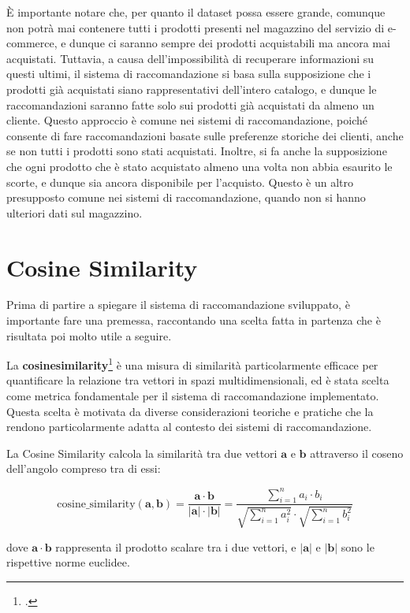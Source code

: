 È importante notare che, per quanto il dataset possa essere grande, comunque non potrà mai contenere tutti i prodotti presenti nel magazzino del servizio di e-commerce, e dunque ci saranno sempre dei prodotti acquistabili ma ancora mai acquistati. Tuttavia, a causa dell'impossibilità di recuperare informazioni su questi ultimi, il sistema di raccomandazione si basa sulla supposizione che i prodotti già acquistati siano rappresentativi dell'intero catalogo, e dunque le raccomandazioni saranno fatte solo sui prodotti già acquistati da almeno un cliente. Questo approccio è comune nei sistemi di raccomandazione, poiché consente di fare raccomandazioni basate sulle preferenze storiche dei clienti, anche se non tutti i prodotti sono stati acquistati.
Inoltre, si fa anche la supposizione che ogni prodotto che è stato acquistato almeno una volta non abbia esaurito le scorte, e dunque sia ancora disponibile per l'acquisto. Questo è un altro presupposto comune nei sistemi di raccomandazione, quando non si hanno ulteriori dati sul magazzino.


\section{Cosine Similarity}

Prima di partire a spiegare il sistema di raccomandazione sviluppato, è importante fare una premessa, raccontando una scelta fatta in partenza che è risultata poi molto utile a seguire.

La \textbf{\gls{cosinesimilarity}}\footcite{site:cosine-similarity} è una misura di similarità particolarmente efficace per quantificare la relazione tra vettori in spazi multidimensionali, ed è stata scelta come metrica fondamentale per il sistema di raccomandazione implementato. Questa scelta è motivata da diverse considerazioni teoriche e pratiche che la rendono particolarmente adatta al contesto dei sistemi di raccomandazione.

La Cosine Similarity calcola la similarità tra due vettori $\mathbf{a}$ e $\mathbf{b}$ attraverso il coseno dell'angolo compreso tra di essi:

\begin{equation}
\text{cosine\_similarity}(\mathbf{a}, \mathbf{b}) = \frac{\mathbf{a} \cdot \mathbf{b}}{|\mathbf{a}| \cdot |\mathbf{b}|} = \frac{\sum_{i=1}^{n} a_i \cdot b_i}{\sqrt{\sum_{i=1}^{n} a_i^2} \cdot \sqrt{\sum_{i=1}^{n} b_i^2}}
\end{equation}

dove $\mathbf{a} \cdot \mathbf{b}$ rappresenta il prodotto scalare tra i due vettori, e $|\mathbf{a}|$ e $|\mathbf{b}|$ sono le rispettive norme euclidee.

